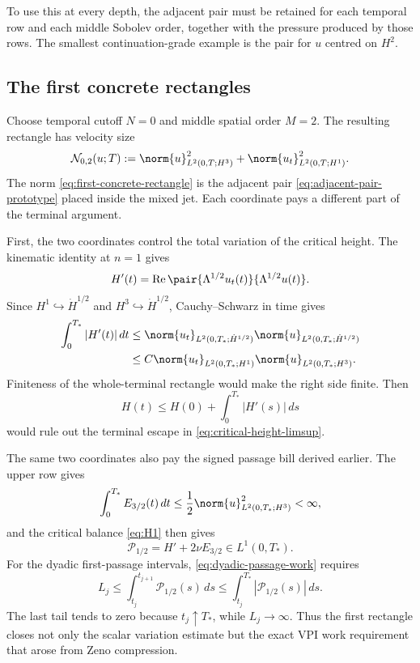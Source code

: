 To use this at every depth, the adjacent pair must be retained for each
temporal row and each middle Sobolev order, together with the pressure produced
by those rows.  The smallest continuation-grade example is the pair for \(u\)
centred on \(H^2\).

\subsection{The first concrete rectangles}

Choose temporal cutoff \(N=0\) and middle spatial order \(M=2\).  The
resulting rectangle has velocity size
\begin{equation}
 \mathcal N_{0,2}(u;T)
 :=\norm{u}_{L^2(0,T;H^3)}^2
   +\norm{u_t}_{L^2(0,T;H^1)}^2.
 \label{eq:first-concrete-rectangle}
\end{equation}
The norm \eqref{eq:first-concrete-rectangle} is the adjacent pair
\eqref{eq:adjacent-pair-prototype} placed inside
the mixed jet.  Each coordinate pays a different part of the terminal
argument.

First, the two coordinates control the total variation of the critical
height.  The kinematic identity at \(n=1\) gives
\begin{equation*}
 H'(t)=\operatorname{Re}
 \pair{\Lambda^{1/2}u_t(t)}{\Lambda^{1/2}u(t)}.
\end{equation*}
Since
\(H^1\hookrightarrow\dot H^{1/2}\) and
\(H^3\hookrightarrow\dot H^{1/2}\), Cauchy--Schwarz in time gives
\begin{align*}
 \int_0^{T_*}|H'(t)|\,dt
 &\le
 \norm{u_t}_{L^2(0,T_*;\dot H^{1/2})}
 \norm{u}_{L^2(0,T_*;\dot H^{1/2})}
 \\
 &\le
 C\norm{u_t}_{L^2(0,T_*;H^1)}
   \norm{u}_{L^2(0,T_*;H^3)}.
\end{align*}
Finiteness of the whole-terminal rectangle would make the right side finite.
Then
\begin{equation*}
 H(t)\le H(0)+\int_0^{T_*}|H'(s)|\,ds
\end{equation*}
would rule out the terminal escape in
\eqref{eq:critical-height-limsup}.

The same two coordinates also pay the signed passage bill derived earlier.
The upper row gives
\begin{equation*}
 \int_0^{T_*}E_{3/2}(t)\,dt
 \le \frac12\norm{u}_{L^2(0,T_*;H^3)}^2<\infty,
\end{equation*}
and the critical balance \eqref{eq:H1} then gives
\begin{equation*}
 \mathcal P_{1/2}=H'+2\nu E_{3/2}\in L^1(0,T_*).
\end{equation*}
For the dyadic first-passage intervals,
\eqref{eq:dyadic-passage-work} requires
\[
 L_j
 \le \int_{t_j}^{t_{j+1}}\mathcal P_{1/2}(s)\,ds
 \le \int_{t_j}^{T_*}|\mathcal P_{1/2}(s)|\,ds.
\]
The last tail tends to zero because \(t_j\uparrow T_*\), while
\(L_j\to\infty\).  Thus the first rectangle closes not only the scalar
variation estimate but the exact VPI work requirement that arose from Zeno
compression.

